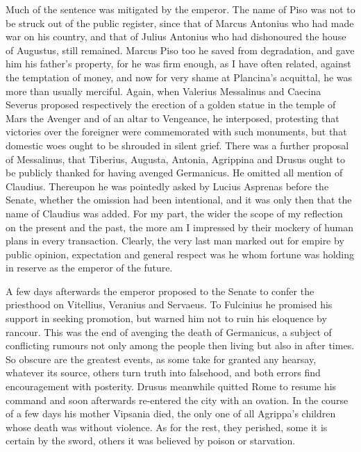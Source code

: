 Much of the sentence was mitigated by the emperor. The name of Piso was not to be struck out of the public register, since that of Marcus Antonius who had made war on his country, and that of Julius Antonius who had dishonoured the house of Augustus, still remained. Marcus Piso too he saved from degradation, and gave him his father's property, for he was firm enough, as I have often related, against the temptation of money, and now for very shame at Plancina's acquittal, he was more than usually merciful. Again, when Valerius Messalinus and Caecina Severus proposed respectively the erection of a golden statue in the temple of Mars the Avenger and of an altar to Vengeance, he interposed, protesting that victories over the foreigner were commemorated with such monuments, but that domestic woes ought to be shrouded in silent grief. There was a further proposal of Messalinus, that Tiberius, Augusta, Antonia, Agrippina and Drusus ought to be publicly thanked for having avenged Germanicus. He omitted all mention of Claudius. Thereupon he was pointedly asked by Lucius Asprenas before the Senate, whether the omission had been intentional, and it was only then that the name of Claudius was added. For my part, the wider the scope of my reflection on the present and the past, the more am I impressed by their mockery of human plans in every transaction. Clearly, the very last man marked out for empire by public opinion, expectation and general respect was he whom fortune was holding in reserve as the emperor of the future.


A few days afterwards the emperor proposed to the Senate to confer the priesthood on Vitellius, Veranius and Servaeus. To Fulcinius he promised his support in seeking promotion, but warned him not to ruin his eloquence by rancour. This was the end of avenging the death of Germanicus, a subject of conflicting rumours not only among the people then living but also in after times. So obscure are the greatest events, as some take for granted any hearsay, whatever its source, others turn truth into falsehood, and both errors find encouragement with posterity. Drusus meanwhile quitted Rome to resume his command and soon afterwards re-entered the city with an ovation. In the course of a few days his mother Vipsania died, the only one of all Agrippa's children whose death was without violence. As for the rest, they perished, some it is certain by the sword, others it was believed by poison or starvation.



